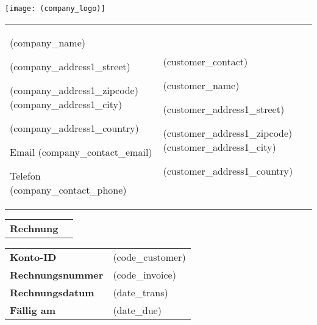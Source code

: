 \documentclass[english]{article}
\providecommand{\tabularnewline}{\\}
\begin{document}
\noindent \texttt{[image: (company\_logo)]}
		

\noindent \begin{tabular}{>{\centering}p{}>{\centering}p{}}
\noindent \begin{flushleft}

(company\_name)

(company\_address1\_street)

(company\_address1\_zipcode) (company\_address1\_city)

(company\_address1\_country)

\vspace{5mm}

{Email} (company\_contact\_email)

{Telefon} (company\_contact\_phone)


\par\end{flushleft}
& \begin{flushleft}

(customer\_contact)

(customer\_name)

(customer\_address1\_street)

(customer\_address1\_zipcode) (customer\_address1\_city)

(customer\_address1\_country)

\par\end{flushleft}
\tabularnewline
\end{tabular}

\noindent \vspace{10mm}

\noindent \begin{tabular}{ll}

\noindent \textbf{Rechnung}

\vspace{5mm}

\end{tabular}

\noindent \vspace{10mm}


\noindent \begin{tabular}{ll}
\textbf{Konto-ID} & (code\_customer) \tabularnewline
\textbf{Rechnungsnummer} & (code\_invoice) \tabularnewline
\textbf{Rechnungsdatum} & (date\_trans) \tabularnewline
\textbf{F\"allig am} & (date\_due) \tabularnewline
\end{tabular}
\end{document}
